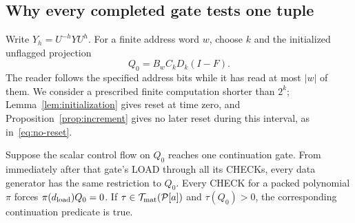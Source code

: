 \subsection{Why every completed gate tests one tuple}\label{sec:loaded-tuple}
Write $Y_h=U^{-h}YU^h$. For a finite address word $w$, choose $k$ and the initialized unflagged projection
\begin{equation}\label{eq:limit-initial-corner}
 Q_0=B_wC_kD_k(I-F).
\end{equation}
The reader follows the specified address bits while it has read at most $|w|$ of them. We consider a prescribed finite computation shorter than $2^k$; Lemma~\ref{lem:initialization} gives reset at time zero, and Proposition~\ref{prop:increment} gives no later reset during this interval, as in~\eqref{eq:no-reset}.

\begin{lemma}\label{lem:loaded-tuple}
Suppose the scalar control flow on $Q_0$ reaches one continuation gate. From immediately after that gate's LOAD through all its CHECKs, every data generator has the same restriction to $Q_0$. Every CHECK for a packed polynomial $\pi$ forces $\pi(d_{\rm load})Q_0=0$. If $\tau\in\mathcal T_{\rm mat}(\mathcal P[a])$ and $\tau(Q_0)>0$, the corresponding continuation predicate is true.
\end{lemma}
